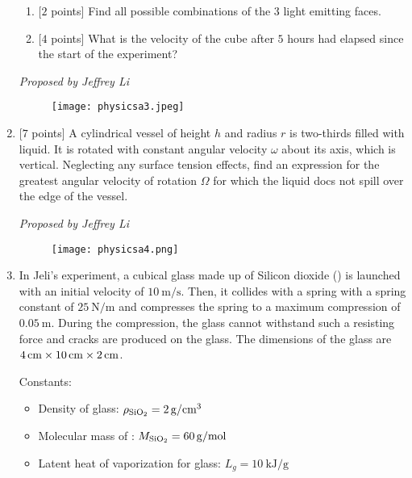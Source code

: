 \begin{enumerate}[align=left,start=1,label=\textbf{\textcolor{meared}{Problem \arabic*}}]
        \begin{enumerate}
            \item {[$2$ points]} Find all possible combinations of the $3$ light emitting faces.
            \item {[$4$ points]} What is the velocity of the cube after $5$ hours had elapsed since the start of the experiment?
        \end{enumerate}

        \textrm{\emph{Proposed by Jeffrey Li}}

        \begin{figure}[!ht]
            \centering
            \texttt{[image: physicsa3.jpeg]}
        \end{figure}
    \newpage
    \item {[$7$ points]}  
        A cylindrical vessel of height $h$ and radius $r$ is two-thirds filled with liquid. It is rotated with constant angular velocity $\omega$ about its axis, which is vertical. Neglecting any surface tension effects, find an expression for the greatest angular velocity of rotation $\Omega$ for which the liquid docs not spill over the edge of the vessel.

        \textrm{\emph{Proposed by Jeffrey Li}}

        \begin{figure}[!ht]
            \centering
            \texttt{[image: physicsa4.png]}
        \end{figure}
    \item 
        In Jeli's experiment, a cubical glass made up of Silicon dioxide () is launched with an initial velocity of $\qty[per-mode = symbol]{10}{\meter\per\second}$. Then, it collides with a spring with a spring constant of $\qty[per-mode = symbol]{25}{\newton\per\meter}$ and compresses the spring to a maximum compression of $\qty[per-mode = symbol]{0.05}{\meter}$. During the compression, the glass cannot withstand such a resisting force and cracks are produced on the glass. The dimensions of the glass are $\qtyproduct{4 x 10 x 2}{\centi\meter}$.

        Constants:
        \begin{itemize}
            \item Density of glass: $\rho_{\ce{SiO_2}} = \qty[per-mode = symbol]{2}{\gram\per\centi\meter\tothe{3}}$
            \item Molecular mass of : $M_{\ce{SiO_2}} = \qty[per-mode = symbol]{60}{\gram\per\mole}$
            \item Latent heat of vaporization for glass: $L_g = \qty[per-mode = symbol]{10}{\kilo\joule\per\gram}$
        \end{itemize}


\end{enumerate}
